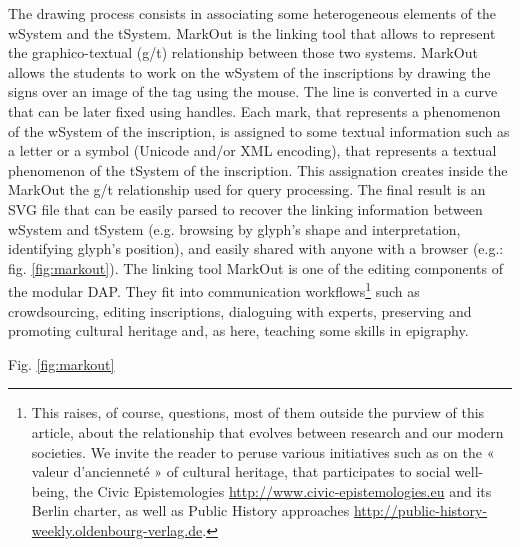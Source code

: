 \documentclass[amsthm,ebook]{saparticle}
\begin{document}
The drawing process consists in associating some heterogeneous elements of the wSystem and the tSystem. MarkOut is the
linking tool that allows to represent the graphico-textual (g/t) relationship between those two systems. MarkOut allows
the students to work on the wSystem of the inscriptions by drawing the signs over an image of the tag using the mouse.
The line is converted in a curve that can be later fixed using handles. Each mark, that represents a phenomenon of the
wSystem of the inscription, is assigned to some textual information such as a letter or a symbol (Unicode and/or XML
encoding), that represents a textual phenomenon of the tSystem of the inscription. This assignation creates inside the
MarkOut the g/t relationship used for query processing. The final result is an SVG file that can be easily parsed to
recover the linking information between wSystem and tSystem (e.g. browsing by glyph's shape and interpretation,
identifying glyph's position), and easily shared with anyone with a browser (e.g.: fig. \ref{fig:markout}). The linking tool MarkOut
is one of the editing components of the modular DAP. They fit into communication workflows\footnote{This raises, of
course, questions, most of them outside the purview of this article, about the relationship that evolves between
research and our modern societies. We invite the reader to peruse various initiatives such as \citet{bertocci_documenter_2006} on the «
valeur d'ancienneté » of cultural heritage, that participates to social well-being, the Civic Epistemologies
\url{http://www.civic-epistemologies.eu} and its Berlin charter, as well as Public History approaches
\url{http://public-history-weekly.oldenbourg-verlag.de}.} such as crowdsourcing, editing inscriptions, dialoguing with
experts, preserving and promoting cultural heritage and, as here, teaching some skills in epigraphy.

Fig. \ref{fig:markout} 
\end{document}
